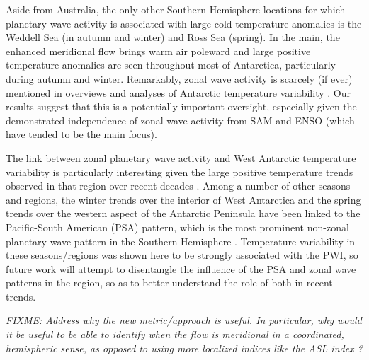 Aside from Australia, the only other Southern Hemisphere locations for which planetary wave activity is associated with large cold temperature anomalies is the Weddell Sea (in autumn and winter) and Ross Sea (spring). In the main, the enhanced meridional flow brings warm air poleward and large positive temperature anomalies are seen throughout most of Antarctica, particularly during autumn and winter. Remarkably, zonal wave activity is scarcely (if ever) mentioned in overviews and analyses of Antarctic temperature variability \citep[e.g.][]{Russell2010,SchneiderOkumura2012,Yu2012}. Our results suggest that this is a potentially important oversight, especially given the demonstrated independence of zonal wave activity from SAM and ENSO (which have tended to be the main focus).   

The link between zonal planetary wave activity and West Antarctic temperature variability is particularly interesting given the large positive temperature trends observed in that region over recent decades \citep[e.g.][]{Bromwich2013}. Among a number of other seasons and regions, the winter trends over the interior of West Antarctica \citep{Ding2011} and the spring trends over the western aspect of the Antarctic Peninsula \citep{Ding2013} have been linked to the Pacific-South American (PSA) pattern, which is the most prominent non-zonal planetary wave pattern in the Southern Hemisphere \citep[e.g.][]{Mo2001}. Temperature variability in these seasons/regions was shown here to be strongly associated with the PWI, so future work will attempt to disentangle the influence of the PSA and zonal wave patterns in the region, so as to better understand the role of both in recent trends.   

\textit{FIXME: Address why the new metric/approach is useful. In particular, why would it be useful to be able to identify when the flow is meridional in a coordinated, hemispheric sense, as opposed to using more localized indices like the ASL index \citep{Turner2013}?}

